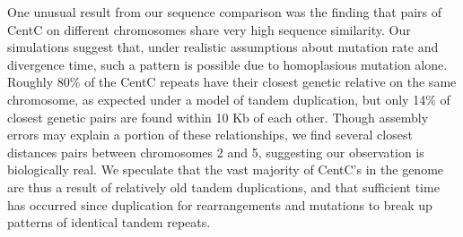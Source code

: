One unusual result from our sequence comparison was the finding that pairs of CentC on different chromosomes share very high sequence similarity.  
Our simulations suggest that, under realistic assumptions about mutation rate and divergence time, such a pattern is possible due to homoplasious mutation alone.  
Roughly 80\% of the CentC repeats have their closest genetic relative on the same chromosome, as expected under a model of tandem duplication, but only 14\% of closest genetic pairs are found within 10 Kb of each other.
Though assembly errors may explain a portion of these relationships, we find several closest distances pairs between chromosomes 2 and 5, suggesting our observation is biologically real.
We speculate that the vast majority of  CentC’s in the genome are thus a result of relatively old tandem duplications, and that sufficient time has occurred since duplication for rearrangements and mutations to break up patterns of identical tandem repeats.



